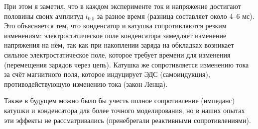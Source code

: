 При этом я заметил, что в каждом эксперименте ток и напряжение достигают половины своих амплитуд \(t_{0.5}\) за разное время (разница составляет около 4–6 мс). Это объясняется тем, что конденсатор и катушка сопротивляются резким изменениям: электростатическое поле конденсатора замедляет изменение напряжения на нём, так как при накоплении заряда на обкладках возникает сильное электростатическое поле, которое требует времени для изменения (перемещения зарядов через цепь). Катушка же сопротивляется изменению тока за счёт магнитного поля, которое индуцирует ЭДС (самоиндукция), противодействующую изменению тока (закон Ленца).

Также в будущем можно было бы учесть полное сопротивление (импеданс) катушки и конденсатора для более точного моделирования, но в наших опытах эти эффекты не рассматривались (пренебрегали реактивными сопротивлениями).
